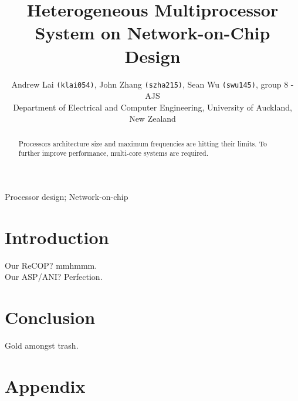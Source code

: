 \documentclass[journal]{IEEEtran}
\begin{document}
	
\begin{titlepage}
	
\end{titlepage}

	
	\title{Heterogeneous Multiprocessor System on Network-on-Chip Design}
	\author{Andrew Lai \texttt{(klai054)}, John Zhang \texttt{(szha215)}, Sean Wu \texttt{(swu145)}, group 8 - AJS \\Department of Electrical and Computer Engineering, University of Auckland, New Zealand}
	
	\maketitle
	
	\begin{abstract}
		Processors architecture size and maximum frequencies are hitting their limits. To further improve performance, multi-core systems are required.
	\end{abstract}
	
	\begin{IEEEkeywords}
		Processor design; Network-on-chip 
	\end{IEEEkeywords}
	
	
	\section{Introduction}
	Our ReCOP? mmhmmm. \\
	Our ASP/ANI? Perfection.
	
	
	\section{Conclusion}
	Gold amongst trash.
	
	
	\section*{Appendix}
	
	
	
	
\end{document}
